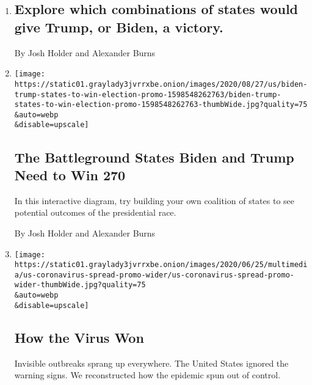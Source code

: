 \begin{enumerate}
\def\labelenumi{\arabic{enumi}.}
\item
  \href{/2020/09/01/us/elections/explore-which-combinations-of-states-would-give-trump-or-biden-a-victory.html}{}

  \hypertarget{explore-which-combinations-of-states-would-give-trump-or-biden-a-victory}{%
  \subsection{Explore which combinations of states would give Trump, or
  Biden, a
  victory.}\label{explore-which-combinations-of-states-would-give-trump-or-biden-a-victory}}

  By Josh Holder and Alexander Burns
\item
  \href{/interactive/2020/us/elections/election-states-biden-trump.html}{}

  \texttt{[image: https://static01.graylady3jvrrxbe.onion/images/2020/08/27/us/biden-trump-states-to-win-election-promo-1598548262763/biden-trump-states-to-win-election-promo-1598548262763-thumbWide.jpg?quality=75\\\&auto=webp\\\&disable=upscale]}

  \hypertarget{the-battleground-states-biden-and-trump-need-to-win-270}{%
  \subsection{The Battleground States Biden and Trump Need to Win
  270}\label{the-battleground-states-biden-and-trump-need-to-win-270}}

  In this interactive diagram, try building your own coalition of states
  to see potential outcomes of the presidential race.

  By Josh Holder and Alexander Burns
\item
  \href{/interactive/2020/us/coronavirus-spread.html}{}

  \texttt{[image: https://static01.graylady3jvrrxbe.onion/images/2020/06/25/multimedia/us-coronavirus-spread-promo-wider/us-coronavirus-spread-promo-wider-thumbWide.jpg?quality=75\\\&auto=webp\\\&disable=upscale]}

  \hypertarget{how-the-virus-won}{%
  \subsection{How the Virus Won}\label{how-the-virus-won}}

  Invisible outbreaks sprang up everywhere. The United States ignored
  the warning signs. We reconstructed how the epidemic spun out of
  control.


\end{enumerate}
